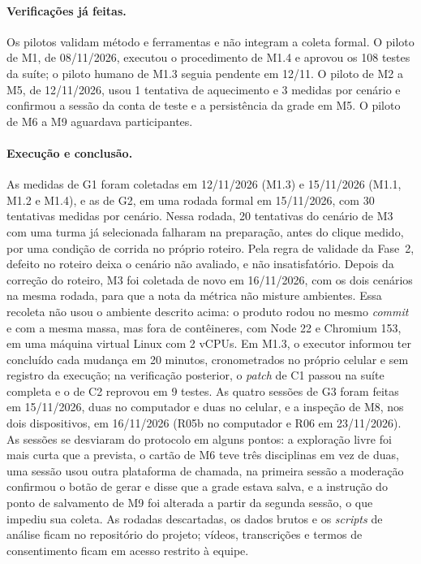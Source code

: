 \documentclass[12pt]{article}
\begin{document}
\paragraph{Verificações já feitas.}
Os pilotos validam método e ferramentas e não integram a coleta formal. O piloto de
M1, de 08/11/2026, executou o procedimento de M1.4 e aprovou os 108 testes da
suíte; o piloto humano de M1.3 seguia pendente em 12/11. O piloto de M2 a M5, de
12/11/2026, usou 1 tentativa de aquecimento e 3 medidas por cenário e confirmou a
sessão da conta de teste e a persistência da grade em M5. O piloto de M6 a M9
aguardava participantes.

\paragraph{Execução e conclusão.}
As medidas de G1 foram coletadas em 12/11/2026 (M1.3) e 15/11/2026 (M1.1, M1.2 e
M1.4), e as de G2, em uma rodada formal em 15/11/2026, com 30 tentativas medidas
por cenário. Nessa rodada, 20 tentativas do cenário de M3 com uma turma já
selecionada falharam na preparação, antes do clique medido, por uma condição de
corrida no próprio roteiro. Pela regra de validade da Fase~2, defeito no roteiro
deixa o cenário não avaliado, e não insatisfatório. Depois da correção do roteiro,
M3 foi coletada de novo em 16/11/2026, com os dois cenários na mesma rodada, para
que a nota da métrica não misture ambientes. Essa recoleta não usou o ambiente
descrito acima: o produto rodou no mesmo \textit{commit} e com a mesma massa, mas
fora de contêineres, com Node 22 e Chromium 153, em uma máquina virtual Linux com
2 vCPUs. Em M1.3, o executor informou ter concluído cada mudança em 20 minutos,
cronometrados no próprio celular e sem registro da execução; na verificação
posterior, o \textit{patch} de C1 passou na suíte completa e o de C2 reprovou em
9 testes. As quatro sessões de G3 foram feitas em 15/11/2026, duas no
computador e duas no celular, e a inspeção de M8, nos dois dispositivos, em
16/11/2026 (R05b no computador e R06 em 23/11/2026). As sessões se desviaram do protocolo em alguns pontos: a exploração livre
foi mais curta que a prevista, o cartão de M6 teve três disciplinas em vez de
duas, uma sessão usou outra plataforma de chamada, na primeira sessão a moderação
confirmou o botão de gerar e disse que a grade estava salva, e a instrução do ponto de
salvamento de M9 foi alterada a partir da segunda sessão, o que impediu sua
coleta. As rodadas descartadas, os dados brutos e os \textit{scripts} de análise
ficam no repositório do projeto; vídeos, transcrições e termos de consentimento
ficam em acesso restrito à equipe.
\end{document}
